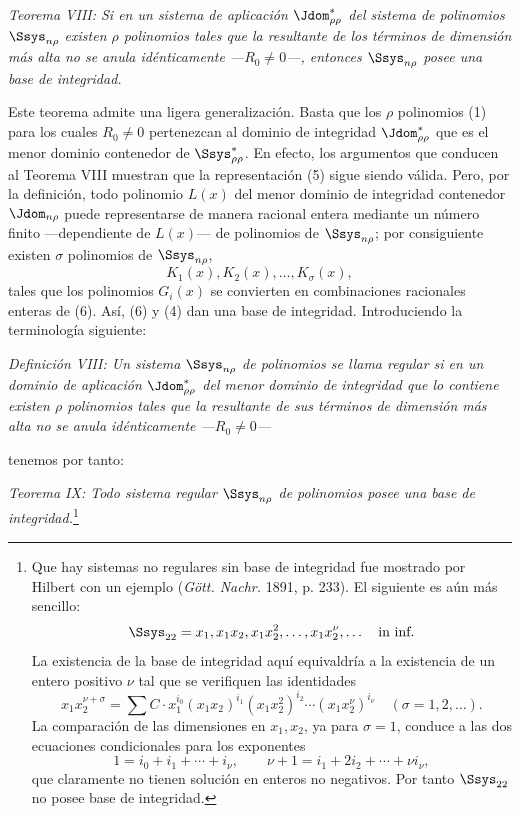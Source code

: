\documentclass[11pt]{article}
\begin{document}
\emph{Teorema VIII: Si en un sistema de aplicación $\Jdom^*_{\rho\rho}$ del sistema de polinomios $\Ssys_{n\rho}$ existen $\rho$ polinomios tales que la resultante de los términos de dimensión más alta no se anula idénticamente ---$R_0\ne0$---, entonces $\Ssys_{n\rho}$ posee una base de integridad.}

Este teorema admite una ligera generalización. Basta que los $\rho$ polinomios (1) para los cuales $R_0\ne0$ pertenezcan al dominio de integridad $\Jdom^*_{\rho\rho}$ que es el menor dominio contenedor de $\Ssys^*_{\rho\rho}$. En efecto, los argumentos que conducen al Teorema VIII muestran que la representación (5) sigue siendo válida. Pero, por la definición, todo polinomio $L(x)$ del menor dominio de integridad contenedor $\Jdom_{n\rho}$ puede representarse de manera racional entera mediante un número finito ---dependiente de $L(x)$--- de polinomios de $\Ssys_{n\rho}$; por consiguiente existen $\sigma$ polinomios de $\Ssys_{n\rho}$,
\begin{equation}
  K_1(x),K_2(x),\ldots,K_\sigma(x),
\tag{6}
\end{equation}
tales que los polinomios $G_i(x)$ se convierten en combinaciones racionales enteras de (6). Así, (6) y (4) dan una base de integridad. Introduciendo la terminología siguiente:

\emph{Definición VIII: Un sistema $\Ssys_{n\rho}$ de polinomios se llama regular si en un dominio de aplicación $\Jdom^*_{\rho\rho}$ del menor dominio de integridad que lo contiene existen $\rho$ polinomios tales que la resultante de sus términos de dimensión más alta no se anula idénticamente ---$R_0\ne0$---}

tenemos por tanto:

\emph{Teorema IX: Todo sistema regular $\Ssys_{n\rho}$ de polinomios posee una base de integridad.}\footnote{Que hay sistemas no regulares sin base de integridad fue mostrado por Hilbert con un ejemplo (\emph{Gött. Nachr.} 1891, p. 233). El siguiente es aún más sencillo:
\[
  \Ssys_{22}=x_1,
  x_1x_2,
  x_1x_2^2,
  \ldots,
  x_1x_2^\nu,
  \ldots\quad\text{in inf.}
\]
La existencia de la base de integridad aquí equivaldría a la existencia de un entero positivo $\nu$ tal que se verifiquen las identidades
\[
  x_1x_2^{\nu+\sigma}=\sum C\cdot x_1^{i_0}(x_1x_2)^{i_1}(x_1x_2^2)^{i_2}\cdots(x_1x_2^\nu)^{i_\nu}
  \quad(\sigma=1,2,\ldots).
\]
La comparación de las dimensiones en $x_1,x_2$, ya para $\sigma=1$, conduce a las dos ecuaciones condicionales para los exponentes
\[
  1=i_0+i_1+\cdots+i_\nu,
  \qquad
  \nu+1=i_1+2i_2+\cdots+\nu i_\nu,
\]
que claramente no tienen solución en enteros no negativos. Por tanto $\Ssys_{22}$ no posee base de integridad.}
\end{document}
